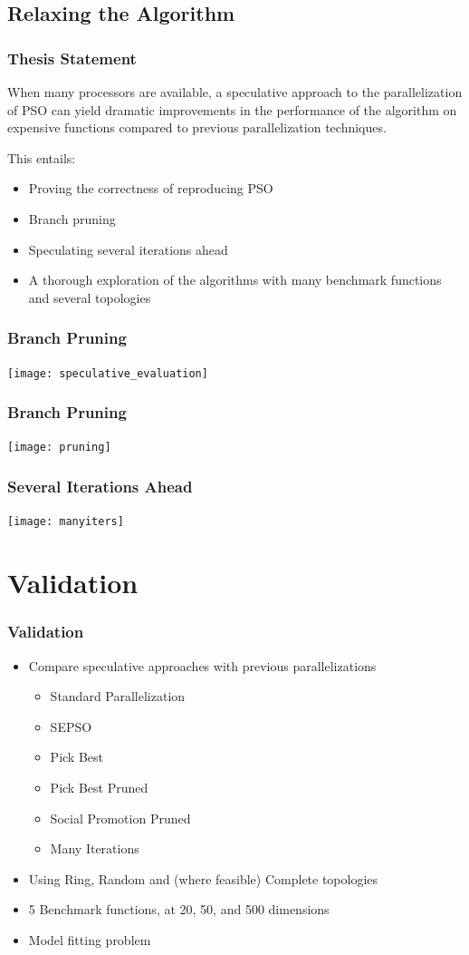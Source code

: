 \documentclass{beamer}
\begin{document}
\subsection{Relaxing the Algorithm}

\begin{frame}
  \frametitle{Thesis Statement}
When many processors are available, a speculative approach to the
parallelization of PSO can yield dramatic improvements in the performance of
the algorithm on expensive functions compared to previous parallelization
techniques.

\mbox{}

\pause
This entails:
\begin{itemize}
  \item Proving the correctness of reproducing PSO
  \item Branch pruning
  \item Speculating several iterations ahead
  \item A thorough exploration of the algorithms with many benchmark functions
	and several topologies
\end{itemize}
\end{frame}


\begin{frame}
  \frametitle{Branch Pruning}
  \texttt{[image: speculative\_evaluation]}
\end{frame}

\begin{frame}
  \frametitle{Branch Pruning}
  \texttt{[image: pruning]}
\end{frame}

\begin{frame}
  \frametitle{Several Iterations Ahead}
  \texttt{[image: manyiters]}
\end{frame}

\section{Validation}

\begin{frame}
  \frametitle{Validation}
  \begin{itemize}
	\item Compare speculative approaches with previous parallelizations
	  \begin{itemize}
		\item Standard Parallelization
		\item SEPSO
		\item Pick Best
		\item Pick Best Pruned
		\item Social Promotion Pruned
		\item Many Iterations
	  \end{itemize}
	\item Using Ring, Random and (where feasible) Complete topologies
	\item 5 Benchmark functions, at 20, 50, and 500 dimensions
	\item Model fitting problem
  \end{itemize}
\end{frame}
\end{document}
